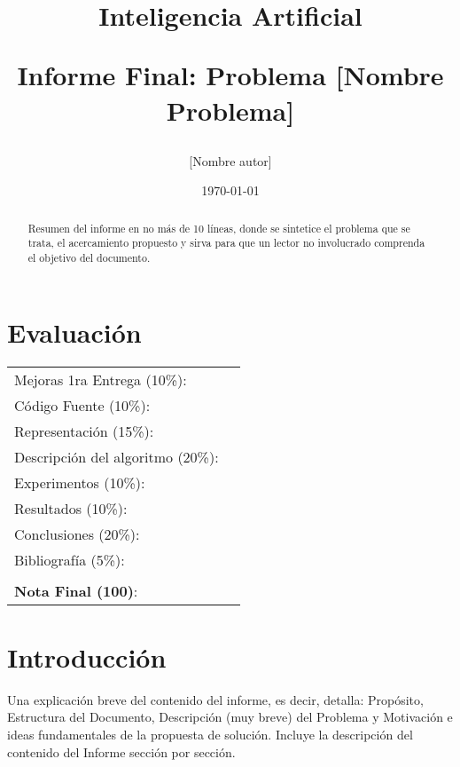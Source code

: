 \documentclass[letter, 10pt]{article}
\begin{document}
\title{Inteligencia Artificial \\ \begin{Large}Informe Final: Problema [Nombre Problema]\end{Large}}
\author{[Nombre autor]}
\date{\today}
\maketitle


\section*{Evaluaci\'on}

\begin{tabular}{ll}
Mejoras 1ra Entrega (10\%): &  \underline{\hspace{2cm}}\\
C\'odigo Fuente (10\%): &  \underline{\hspace{2cm}}\\
Representaci\'on (15\%):  & \underline{\hspace{2cm}} \\
Descripci\'on del algoritmo (20\%):  & \underline{\hspace{2cm}} \\
Experimentos (10\%):  & \underline{\hspace{2cm}} \\
Resultados (10\%):  & \underline{\hspace{2cm}} \\
Conclusiones (20\%): &  \underline{\hspace{2cm}}\\
Bibliograf\'ia (5\%): & \underline{\hspace{2cm}}\\
 &  \\
\textbf{Nota Final (100)}:   & \underline{\hspace{2cm}}
\end{tabular}

\begin{abstract}
Resumen del informe en no m\'as de 10 l\'ineas, donde se sintetice el problema que se trata, el acercamiento propuesto
y sirva para que un lector no involucrado comprenda el objetivo del documento.
\end{abstract}

\section{Introducci\'on}
Una explicaci\'on breve del contenido del informe, es decir, detalla: Prop\'osito, Estructura del Documento, Descripci\'on (muy breve) del Problema y Motivaci\'on e ideas fundamentales de la propuesta de soluci\'on. Incluye la descripci\'on del contenido del Informe secci\'on por secci\'on.
\end{document}
